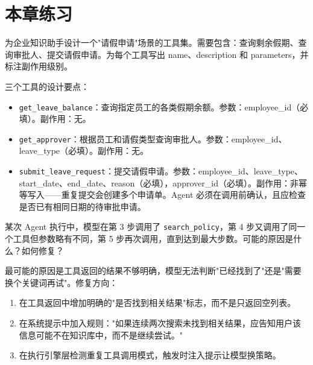 \section{本章练习}
\begin{exercise}[设计工具集]
为企业知识助手设计一个"请假申请"场景的工具集。需要包含：查询剩余假期、查询审批人、提交请假申请。为每个工具写出 name、description 和 parameters，并标注副作用级别。
\end{exercise}

\begin{solution}
三个工具的设计要点：
\begin{itemize}
  \item \texttt{get\_leave\_balance}：查询指定员工的各类假期余额。参数：employee\_id（必填）。副作用：无。
  \item \texttt{get\_approver}：根据员工和请假类型查询审批人。参数：employee\_id、leave\_type（必填）。副作用：无。
  \item \texttt{submit\_leave\_request}：提交请假申请。参数：employee\_id、leave\_type、start\_date、end\_date、reason（必填），approver\_id（必填）。副作用：非幂等写入——重复提交会创建多个申请单。Agent 必须在调用前确认，且应检查是否已有相同日期的待审批申请。
\end{itemize}
\end{solution}

\begin{exercise}
某次 Agent 执行中，模型在第 3 步调用了 \texttt{search\_policy}，第 4 步又调用了同一个工具但参数略有不同，第 5 步再次调用，直到达到最大步数。可能的原因是什么？如何修复？
\end{exercise}

\begin{solution}
最可能的原因是工具返回的结果不够明确，模型无法判断"已经找到了"还是"需要换个关键词再试"。修复方向：
\begin{enumerate}
  \item 在工具返回中增加明确的"是否找到相关结果"标志，而不是只返回空列表。
  \item 在系统提示中加入规则："如果连续两次搜索未找到相关结果，应告知用户该信息可能不在知识库中，而不是继续尝试。"
  \item 在执行引擎层检测重复工具调用模式，触发时注入提示让模型换策略。
\end{enumerate}
\end{solution}

